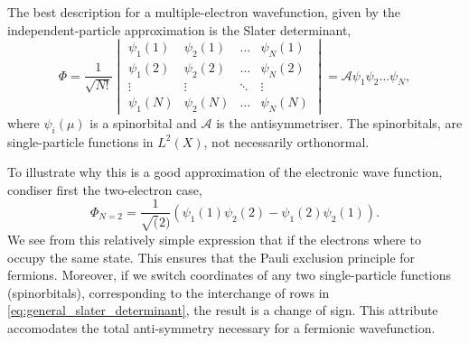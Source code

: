        The best description for a multiple-electron wavefunction, given by the independent-particle
        approximation is the Slater determinant,
        \begin{equation}
            \label{eq:general_slater_determinant}
            \Phi = \frac{1}{\sqrt{N!}} \begin{vmatrix}
                \psi_1(1) & \psi_2(1) & \dots & \psi_N(1) \\
                \psi_1(2) & \psi_2(2) & \dots & \psi_N(2) \\
                \vdots & \vdots & \ddots & \vdots \\
                \psi_1(N) & \psi_2(N) & \dots & \psi_N(N)
            \end{vmatrix}
            = \mathscr{A}\psi_1 \psi_2 \dots \psi_N,
        \end{equation}
        where $\psi_i(\mu)$ is a spinorbital and $\mathscr{A}$ is the antisymmetriser. The
        spinorbitals, are single-particle functions in $L^2(X)$, not necessarily orthonormal.

        To illustrate why this is a good approximation of the electronic wave function,
        condiser first the two-electron case,
        \begin{equation}
            \Phi_{N=2} = \frac{1}{\sqrt(2)}(\psi_1(1)\psi_2(2) - \psi_1(2)\psi_2(1)).
        \end{equation}
        We see from this relatively simple expression that if the electrons where to occupy
        the same state. This ensures that the Pauli exclusion principle for 
        fermions\cite{pauli1925zusammenhang}. Moreover, if we switch coordinates of any two 
        single-particle functions (spinorbitals), corresponding to the interchange of rows in
        \autoref{eq:general_slater_determinant}, the result is a change of sign. This attribute
        accomodates the total anti-symmetry necessary for a fermionic wavefunction.       